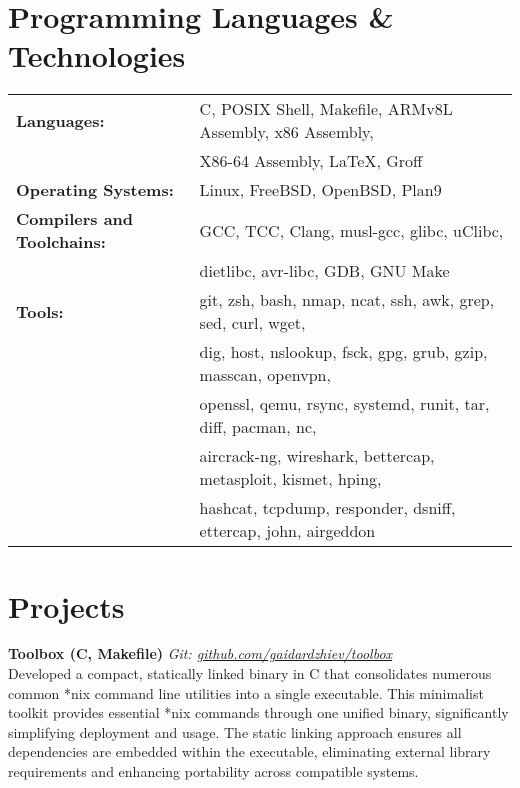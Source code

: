 \documentclass[a4paper,10pt]{article}
\begin{document}
\section*{Programming Languages \& Technologies}
\begin{tabular}{@{} l l @{}}
\textbf{Languages:} & C, POSIX Shell, Makefile, ARMv8L Assembly, x86 Assembly, \\
                    & X86-64 Assembly, LaTeX, Groff \\[6pt]

\textbf{Operating Systems:} & Linux, FreeBSD, OpenBSD, Plan9 \\[6pt]

\textbf{Compilers and Toolchains:} & GCC, TCC, Clang, musl-gcc, glibc, uClibc, \\
                                   & dietlibc, avr-libc, GDB, GNU Make \\[6pt]

\textbf{Tools:} & git, zsh, bash, nmap, ncat, ssh, awk, grep, sed, curl, wget, \\
                & dig, host, nslookup, fsck, gpg, grub, gzip, masscan, openvpn, \\
                & openssl, qemu, rsync, systemd, runit, tar, diff, pacman, nc, \\
		& aircrack-ng, wireshark, bettercap, metasploit, kismet, hping, \\
		& hashcat, tcpdump, responder, dsniff, ettercap, john, airgeddon
\end{tabular}

\section*{Projects}

\noindent
\textbf{Toolbox (C, Makefile)} \hfill \textit{Git: \href{https://github.com/gaidardzhiev}{github.com/gaidardzhiev/toolbox}} \\
Developed a compact, statically linked binary in C that consolidates numerous common *nix command line utilities into a single executable. This minimalist toolkit provides essential *nix commands through one unified binary, significantly simplifying deployment and usage. The static linking approach ensures all dependencies are embedded within the executable, eliminating external library requirements and enhancing portability across compatible systems.

\vspace{6pt}
\end{document}
